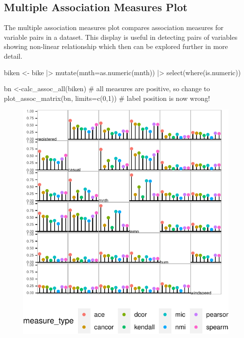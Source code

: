 \hypertarget{multiple-association-measures-plot}{%
\subsection{Multiple Association Measures
Plot}\label{multiple-association-measures-plot}}

The multiple association measures plot compares association measures for
variable pairs in a dataset. This display is useful in detecting pairs
of variables showing non-linear relationship which then can be explored
further in more detail.

\begin{Schunk}
\begin{Sinput}
biken <- bike |>
  mutate(mnth=as.numeric(mnth)) |>
  select(where(is.numeric))

bn <-calc_assoc_all(biken)
# all measures are positive, so change to
plot_assoc_matrix(bn, limits=c(0,1)) # label position is now wrong!
\end{Sinput}
\begin{figure}

{\centering \includegraphics{rj_paper_files/figure-latex/compare-linear-heatmap-1} 

}


\end{figure}
\end{Schunk}
